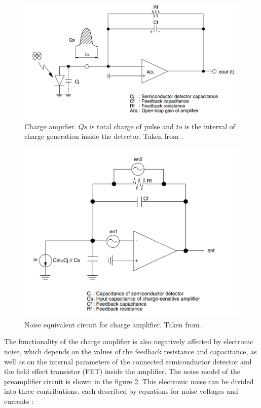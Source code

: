 \begin{figure}[H]
 \centering
 \includegraphics[scale=0.4, angle = 0]{./pictures/champlifier.png}
 \caption{Charge ampifier. $Qs$ is total charge of pulse and $to$ is the interval of charge generation inside the detector. Taken from \cite{charge}.}
 \label{trans} 
\end{figure}
\begin{figure}[H]
 \centering
 \includegraphics[scale=0.4, angle = 0]{./pictures/NoiseEquiv.png}
 \caption{Noise equivalent circuit for charge amplifier. Taken from \cite{charge}.}
 \label{transNoise} 
\end{figure}
The functionality of the charge amplifier is also negatively affected by electronic noise, which depends on the values of the feedback resistance and capacitance, as well as on the internal parameters of the connected semiconductor detector and the field effect transistor (FET) inside the amplifier. The noise model of the preamplifier circuit is shown in the figure \ref{transNoise}. This electronic noise can be divided into three contributions, each described by equations for noise voltages and currents \cite{charge}:

